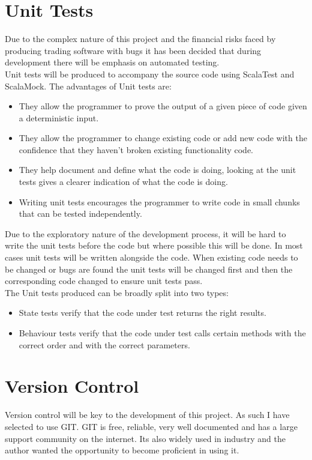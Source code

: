 	\section{Unit Tests}
		Due to the complex nature of this project and the financial risks faced by producing trading software with bugs it has been decided that during development there will be emphasis on automated testing.\\ 
		
		Unit tests will be produced to accompany the source code using ScalaTest and ScalaMock. The advantages of Unit tests are:
		
		\begin{itemize}
			\item They allow the programmer to prove the output of a given piece of code given a deterministic input.
			\item They allow the programmer to change existing code or add new code with the confidence that they haven't broken existing functionality code.
			\item They help document and define what the code is doing, looking at the unit tests gives a clearer indication of what the code is doing.
			\item Writing unit tests encourages the programmer to write code in small chunks that can be tested independently.
		\end{itemize}
		
		Due to the exploratory nature of the development process, it will be hard to write the unit tests before the code but where possible this will be done. In most cases unit tests will be written alongside the code. When existing code needs to be changed or bugs are found the unit tests will be changed first and then the corresponding code changed to ensure unit tests pass\cite{TestingStatevsInteractions}.\\
		
		The Unit tests produced can be broadly split into two types: 
			
			\begin{itemize}
				\item State tests verify that the code under test returns the right results.
				\item Behaviour tests verify that the code under test calls certain methods with the correct order and with the correct parameters.
			\end{itemize}				
		
	\section{Version Control}
		Version control will be key to the development of this project. As such I have selected to use GIT\cite{GIT}. GIT is free, reliable, very well documented and has a large support community on the internet. Its also widely used in industry and the author wanted the opportunity to become proficient in using it.
